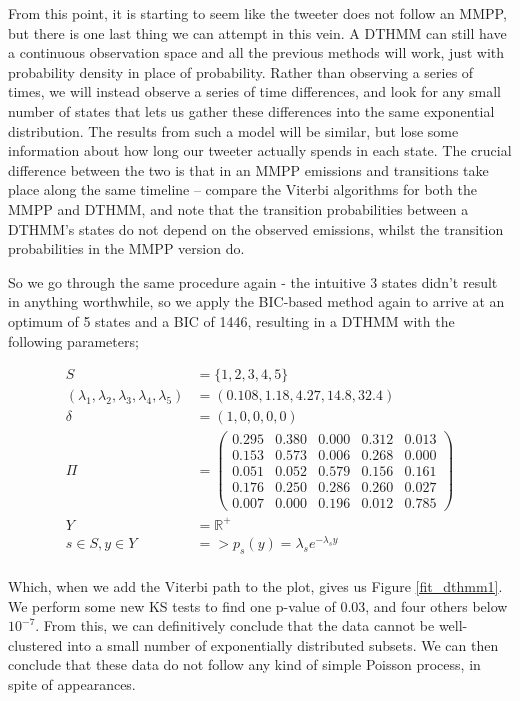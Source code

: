 From this point, it is starting to seem like the tweeter does not follow an MMPP, but there is one last thing we can attempt in this vein. A DTHMM can still have a continuous observation space and all the previous methods will work, just with probability density in place of probability. Rather than observing a series of times, we will instead observe a series of time differences, and look for any small number of states that lets us gather these differences into the same exponential distribution. The results from such a model will be similar, but lose some information about how long our tweeter actually spends in each state. The crucial difference between the two is that in an MMPP emissions and transitions take place along the same timeline -- compare the Viterbi algorithms for both the MMPP and DTHMM, and note that the transition probabilities between a DTHMM's states do not depend on the observed emissions, whilst the transition probabilities in the MMPP version do.

So we go through the same procedure again - the intuitive 3 states didn't result in anything worthwhile, so we apply the BIC-based method again to arrive at an optimum of 5 states and a BIC of 1446, resulting in a DTHMM with the following parameters;

\begin{align*}
S &= \{1,2,3,4,5\}\\
(\lambda_1,\lambda_2,\lambda_3,\lambda_4,\lambda_5) &= (0.108, 1.18, 4.27, 14.8, 32.4)\\
\delta &= (1,0,0,0,0)\\
\Pi &= 
\left(
    \begin{matrix}
    0.295 & 0.380 & 0.000 & 0.312 & 0.013 \\
    0.153 & 0.573 & 0.006 & 0.268 & 0.000 \\
    0.051 & 0.052 & 0.579 & 0.156 & 0.161 \\
    0.176 & 0.250 & 0.286 & 0.260 & 0.027 \\
    0.007 & 0.000 & 0.196 & 0.012 & 0.785
    \end{matrix}
\right)\\
Y &= \mathbb{R}^{+}\\
s \in S, y \in Y &=> p_s(y) = \lambda_s e^{-\lambda_sy}\\
\end{align*}

Which, when we add the Viterbi path to the plot, gives us Figure \ref{fit_dthmm1}. We perform some new KS tests to find one p-value of 0.03, and four others below $10^{-7}$. From this, we can definitively conclude that the data cannot be well-clustered into a small number of exponentially distributed subsets. We can then conclude that these data do not follow any kind of simple Poisson process, in spite of appearances.

